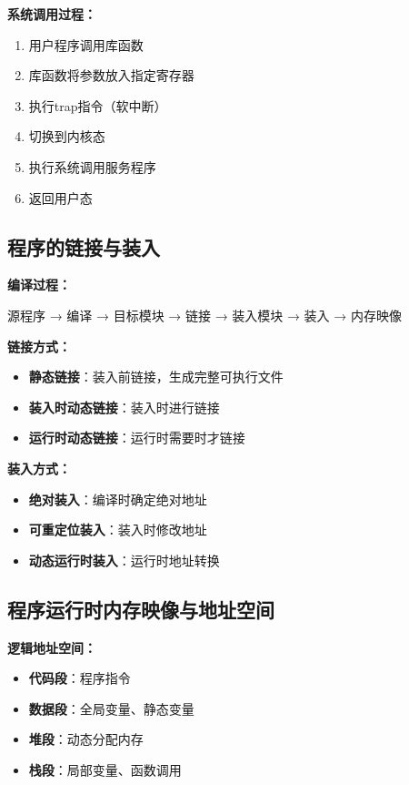 \documentclass[lang=cn,newtx,10pt,scheme=chinese]{../../elegantbook}
\begin{document}
\textbf{系统调用过程：}
\begin{enumerate}
  \item 用户程序调用库函数
  \item 库函数将参数放入指定寄存器
  \item 执行trap指令（软中断）
  \item 切换到内核态
  \item 执行系统调用服务程序
  \item 返回用户态
\end{enumerate}

\subsection{程序的链接与装入}

\textbf{编译过程：}
\begin{center}
源程序 → 编译 → 目标模块 → 链接 → 装入模块 → 装入 → 内存映像
\end{center}

\textbf{链接方式：}
\begin{itemize}
  \item \textbf{静态链接}：装入前链接，生成完整可执行文件
  \item \textbf{装入时动态链接}：装入时进行链接
  \item \textbf{运行时动态链接}：运行时需要时才链接
\end{itemize}

\textbf{装入方式：}
\begin{itemize}
  \item \textbf{绝对装入}：编译时确定绝对地址
  \item \textbf{可重定位装入}：装入时修改地址
  \item \textbf{动态运行时装入}：运行时地址转换
\end{itemize}

\subsection{程序运行时内存映像与地址空间}

\textbf{逻辑地址空间：}
\begin{itemize}
  \item \textbf{代码段}：程序指令
  \item \textbf{数据段}：全局变量、静态变量
  \item \textbf{堆段}：动态分配内存
  \item \textbf{栈段}：局部变量、函数调用
\end{itemize}
\end{document}
